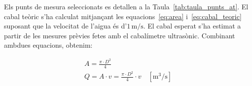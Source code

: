 \documentclass[11pt]{article}
\begin{document}
Els punts de mesura seleccionats es detallen a la Taula~\ref{tab:taula_punts_at}. El cabal teòric s'ha calculat mitjançant les equacions~\eqref{eq:area} i~\eqref{eq:cabal_teoric} suposant que la velocitat de l'aigua és d'$1\,\mathrm{m/s}$. El cabal esperat s'ha estimat a partir de les mesures prèvies fetes amb el cabalímetre ultrasònic. Combinant ambdues equacions, obtenim:

\begin{gather}
    A = \frac{\pi \cdot D^2}{4} \label{eq:area} \\
    Q = A \cdot v = \frac{\pi \cdot D^2}{4} \cdot v \quad [\mathrm{m^3/s}]
    \label{eq:cabal_teoric}
\end{gather}

\begin{table}[htbp]
    \centering
    \caption{Punts de mesura del circuit d'aigua de torres (AT).}
    \label{tab:taula_punts_at}
\end{table}
\end{document}
